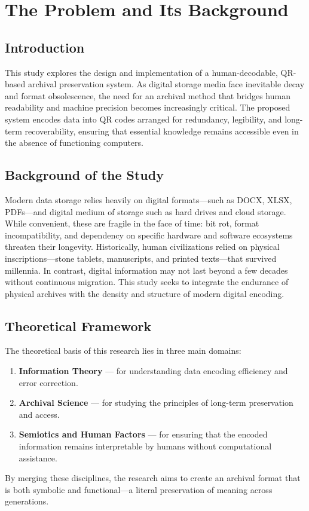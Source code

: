 \documentclass[../main]{subfiles}
\begin{document}
\chapter{The Problem and Its Background}

\section{Introduction}

This study explores the design and implementation of a human-decodable, QR-based archival preservation system. As digital storage media face inevitable decay and format obsolescence, the need for an archival method that bridges human readability and machine precision becomes increasingly critical. The proposed system encodes data into QR codes arranged for redundancy, legibility, and long-term recoverability, ensuring that essential knowledge remains accessible even in the absence of functioning computers.

\section{Background of the Study}

Modern data storage relies heavily on digital formats---such as DOCX, XLSX, PDFs---and digital medium of storage such as hard drives and cloud storage. While convenient, these are fragile in the face of time: bit rot, format incompatibility, and dependency on specific hardware and software ecosystems threaten their longevity. Historically, human civilizations relied on physical inscriptions—stone tablets, manuscripts, and printed texts—that survived millennia. In contrast, digital information may not last beyond a few decades without continuous migration. This study seeks to integrate the endurance of physical archives with the density and structure of modern digital encoding.

\section{Theoretical Framework}

The theoretical basis of this research lies in three main domains:
\begin{enumerate}
\item \textbf{Information Theory} — for understanding data encoding efficiency and error correction.
\item \textbf{Archival Science} — for studying the principles of long-term preservation and access.
\item \textbf{Semiotics and Human Factors} — for ensuring that the encoded information remains interpretable by humans without computational assistance.
\end{enumerate}
By merging these disciplines, the research aims to create an archival format that is both symbolic and functional—a literal preservation of meaning across generations.
\end{document}
